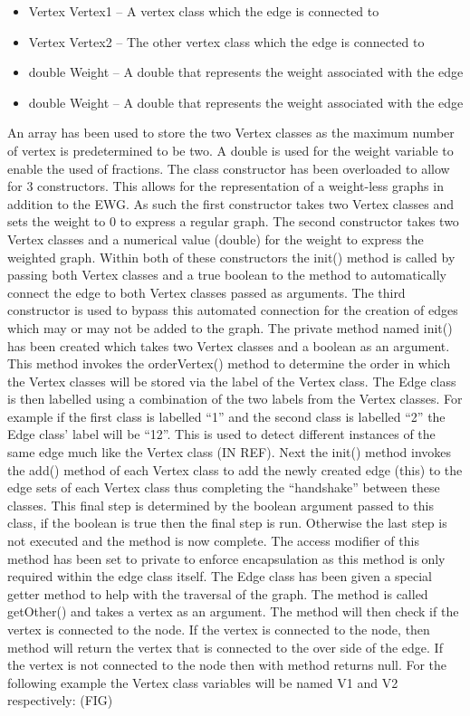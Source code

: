 \documentclass{AISB2008}
\begin{document}
\begin{itemize}
\item Vertex Vertex1 – A vertex class which the edge is connected to
\item Vertex Vertex2 – The other vertex class which the edge is connected to
\item double Weight – A double that represents the weight associated with the edge
\item double Weight – A double that represents the weight associated with the edge
\end{itemize}

An array has been used to store the two Vertex classes as the maximum number of vertex is predetermined to be two. A double is used for the weight variable to enable the used of fractions. 
The class constructor has been overloaded to allow for 3 constructors. This allows for the representation of a weight-less graphs in addition to the EWG. As such the first constructor takes two Vertex classes and sets the weight to 0 to express a regular graph. The second constructor takes two Vertex classes and a numerical value (double) for the weight to express the weighted graph. Within both of these constructors the init()  method is called by passing both Vertex classes and a true boolean to the method to automatically connect the edge to both Vertex classes passed as arguments. The third constructor is used to bypass this automated connection for the creation of edges which may or may not be added to the graph.
The private method named init() has been created which takes two Vertex classes and a boolean as an argument. This method invokes the orderVertex() method to determine the order in which the Vertex classes will be stored via the label of the Vertex class. The Edge class is then labelled using a combination of the two labels from the Vertex classes. For example if the first class is labelled “1” and the second class is labelled “2” the Edge class’ label will be “12”. This is used to detect different instances of the same edge much like the Vertex class (IN REF). Next the init() method invokes the add() method of each Vertex class to add the newly created edge (this) to the edge sets of each Vertex class thus completing the “handshake” between these classes. This final step is determined by the boolean argument passed to this class, if the boolean is true then the final step is run. Otherwise the last step is not executed and the method is now complete. The access modifier of this method has been set to private to enforce encapsulation as this method is only required within the edge class itself.
The Edge class has been given a special getter method to help with the traversal of the graph. The method is called getOther() and takes a vertex as an argument. The method will then check if the vertex is connected to the node. If the vertex is connected to the node, then method will return the vertex that is connected to the over side of the edge. If the vertex is not connected to the node then with method returns null.
For the following example the Vertex class variables will be named V1 and V2 respectively:
(FIG)
\end{document}

